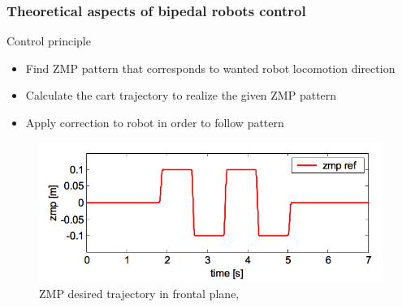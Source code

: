 \documentclass{beamer}
\begin{document}
	\begin{frame}
		\frametitle{Theoretical aspects of bipedal robots control}
		\begin{block}{Control principle}
			\begin{itemize}
				\item
				Find ZMP pattern that corresponds to wanted robot locomotion direction
				\item
				Calculate the cart trajectory to realize the given ZMP pattern
				\item
				Apply correction to robot in order to follow pattern
			\end{itemize}
		\end{block}
		
		\begin{figure}[h!]
			\begin{minipage}[H]{\linewidth}
				\centering
				\includegraphics[width=0.85\linewidth]{presentation_images/13}
				\caption{ZMP desired trajectory in frontal plane, \cite{kajita2003biped}}
			\end{minipage}
		\end{figure}
	\end{frame}
	
\end{document}
